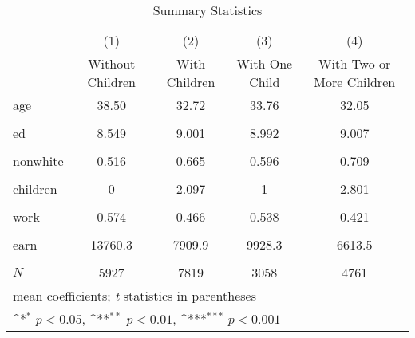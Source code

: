 \begin{table}[htbp]\centering
\def\sym#1{\ifmmode^{#1}\else\(^{#1}\)\fi}
\caption{Summary Statistics}
\begin{tabular}{l*{4}{c}}
\hline\hline
            &\multicolumn{1}{c}{(1)}&\multicolumn{1}{c}{(2)}&\multicolumn{1}{c}{(3)}&\multicolumn{1}{c}{(4)}\\
            &\multicolumn{1}{c}{Without Children}&\multicolumn{1}{c}{With Children}&\multicolumn{1}{c}{With One Child}&\multicolumn{1}{c}{With Two or More Children}\\
\hline
age         &       38.50         &       32.72         &       33.76         &       32.05         \\
            &                     &                     &                     &                     \\
[1em]
ed          &       8.549         &       9.001         &       8.992         &       9.007         \\
            &                     &                     &                     &                     \\
[1em]
nonwhite    &       0.516         &       0.665         &       0.596         &       0.709         \\
            &                     &                     &                     &                     \\
[1em]
children    &           0         &       2.097         &           1         &       2.801         \\
            &                     &                     &                     &                     \\
[1em]
work        &       0.574         &       0.466         &       0.538         &       0.421         \\
            &                     &                     &                     &                     \\
[1em]
earn        &     13760.3         &      7909.9         &      9928.3         &      6613.5         \\
            &                     &                     &                     &                     \\
\hline
\(N\)       &        5927         &        7819         &        3058         &        4761         \\
\hline\hline
\multicolumn{5}{l}{\footnotesize mean coefficients; \textit{t} statistics in parentheses}\\
\multicolumn{5}{l}{\footnotesize \sym{*} \(p<0.05\), \sym{**} \(p<0.01\), \sym{***} \(p<0.001\)}\\
\end{tabular}
\end{table}
